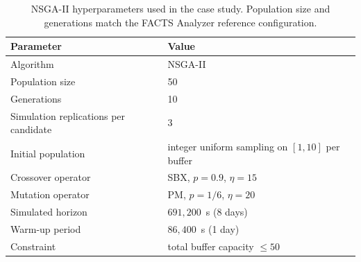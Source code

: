 \documentclass[a4paper,fleqn]{cas-sc}
\begin{document}
  \begin{table}[ ]                                                                                                  
  \caption{NSGA-II hyperparameters used in the case study. Population size and generations match the FACTS Analyzer
  reference configuration.}                                                                                             
  \label{tbl:hyper}                                         
  \centering                                                                                                            
  \begin{tabular}{@{}l l@{}}                                                                                            
  \toprule                                                                                                              
  \textbf{Parameter} & \textbf{Value} \\                                                                                
  \midrule                                                                                                              
  Algorithm & NSGA-II \citep{Deb2002nsga2} \\                                                                           
  Population size & 50 \\                                                                                               
  Generations & 10 \\                                                                                                   
  Simulation replications per candidate & 3 \\                                                                          
  Initial population & integer uniform sampling on $[1, 10]$ per buffer \\                                              
  Crossover operator & SBX, $p = 0.9$, $\eta = 15$ \\                                                                   
  Mutation operator & PM, $p = 1/6$, $\eta = 20$ \\                                                                     
  Simulated horizon & $691{,}200$~s (8 days) \\                                                                         
  Warm-up period & $86{,}400$~s (1 day) \\                                                                              
  Constraint & total buffer capacity $\leq 50$ \\                                                                       
  \bottomrule                                                                                                           
  \end{tabular}                                                                                                         
  \end{table}                                                                                                           
                                                                                                                        
\end{document}
